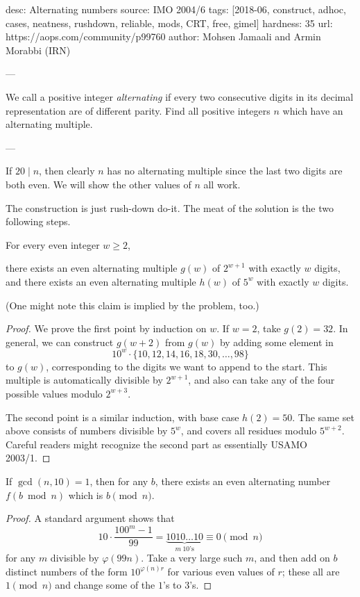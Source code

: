desc: Alternating numbers
source: IMO 2004/6
tags: [2018-06, construct, adhoc, cases, neatness, rushdown, reliable, mods, CRT, free, gimel]
hardness: 35
url: https://aops.com/community/p99760
author:  Mohsen Jamaali and Armin Morabbi (IRN)

---

We call a positive integer \emph{alternating} if every two consecutive digits
in its decimal representation are of different parity.
Find all positive integers $n$ which have an alternating multiple.

---

If $20 \mid n$, then clearly $n$ has no alternating
multiple since the last two digits are both even.
We will show the other values of $n$ all work.

The construction is just rush-down do-it.
The meat of the solution is the two following steps.
\begin{claim*}
  For every even integer $w \ge 2$,
  \begin{itemize}
    \ii there exists an even alternating multiple $g(w)$ of $2^{w+1}$
    with exactly $w$ digits, and
    \ii there exists an even alternating multiple $h(w)$ of $5^{w}$
    with exactly $w$ digits.
  \end{itemize}
\end{claim*}
(One might note this claim is implied by the problem, too.)
\begin{proof}
  We prove the first point by induction on $w$.
  If $w = 2$, take $g(2) = 32$.
  In general, we can construct $g(w+2)$ from $g(w)$
  by adding some element in
  \[ 10^w \cdot \{10, 12, 14, 16, 18, 30, \dots, 98\} \]
  to $g(w)$, corresponding to the digits
  we want to append to the start.
  This multiple is automatically divisible by $2^{w+1}$,
  and also can take any of the four possible values modulo $2^{w+3}$.

  The second point is a similar induction,
  with base case $h(2) = 50$.
  The same set above consists of numbers divisible by $5^w$,
  and covers all residues modulo $5^{w+2}$.
  Careful readers might recognize the second part
  as essentially USAMO 2003/1.
\end{proof}

\begin{claim*}
  If $\gcd(n,10) = 1$, then for any $b$,
  there exists an even alternating number $f(b \bmod n)$ which is
  $b \pmod n$.
\end{claim*}
\begin{proof}
  A standard argument shows that
  \[ 10 \cdot \frac{100^m-1}{99}
    = \underbrace{1010\dots10}_{m\ 10\text{'s}}
    \equiv 0 \pmod n \]
  for any $m$ divisible by $\varphi(99n)$.
  Take a very large such $m$,
  and then add on $b$ distinct numbers of the form $10^{\varphi(n)r}$
  for various even values of $r$; these all are $1 \pmod n$
  and change some of the $1$'s to $3$'s.
\end{proof}


